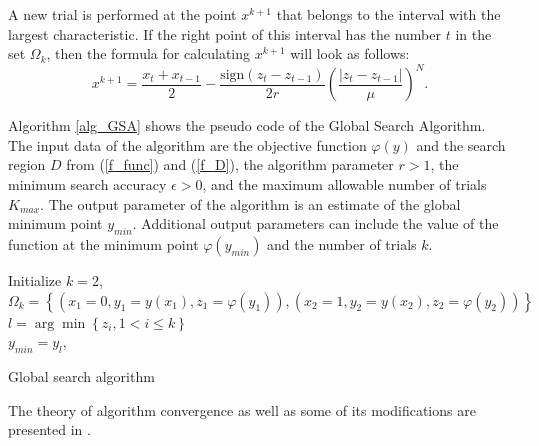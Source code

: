 \documentclass[preprint,12pt]{elsarticle}
\begin{document}
A new trial is performed at the point $x^{k+1}$ that belongs to the interval
with the largest characteristic. If the right point of this interval has the number $t$ in the set $\Omega_k$, then the formula for calculating $x^{k+1}$ will look as follows:
\begin{equation}\label{xk1}
x^{k+1} = \frac{x_t+x_{t-1}}{2}- \frac{\mathrm{sign}(z_t-z_{t-1})}{2r} \left(\frac{\left|z_t-z_{t-1}\right|}{\mu}\right)^N.   
\end{equation}

Algorithm \ref{alg_GSA} shows the pseudo code of the Global Search Algorithm. The input data of the algorithm are the objective function $\varphi(y)$ and the search region $D$ from (\ref{f_func}) and (\ref{f_D}), the algorithm parameter $r>1$, the minimum search accuracy $\epsilon > 0$, and the maximum allowable number of trials $K_{max}$. The output parameter of the algorithm is an estimate of the global minimum point $y_{min}$. Additional output parameters can include the value of the function at the minimum point $\varphi(y_{min})$ and the number of trials $k$.

\begin{algorithm}
\LinesNumbered
 Initialize $k=2$, $\Omega_k= \left\{ (x_1=0, y_1=y(x_1), z_1=\varphi(y_1)), (x_2=1, y_2=y(x_2), z_2=\varphi(y_2)) \right\}$\\
 $l = \arg \min \left\{ z_i, 1 < i \leq k \right\}$\\
 $y_{min} = y_l$, \\ 
 \caption{Global search algorithm}\label{alg_GSA}
\end{algorithm}

The theory of algorithm convergence as well as some of its modifications are presented in \cite{Strongin2000}.
\end{document}
